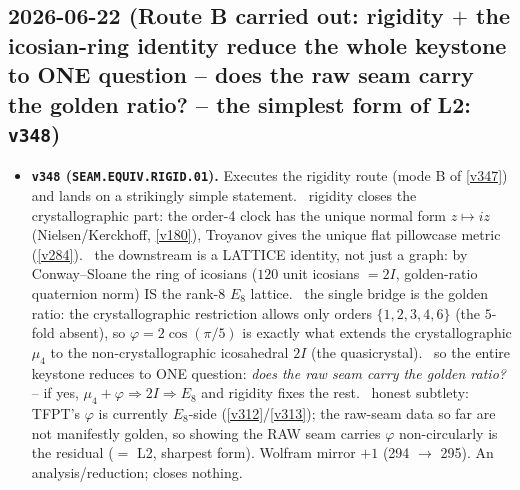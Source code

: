 \subsection*{2026-06-22 (Route B carried out: rigidity $+$ the icosian-ring identity reduce the whole keystone to ONE question -- does the raw seam carry the golden ratio? -- the simplest form of L2: \texttt{v348})}
\begin{itemize}
\item \textbf{\texttt{v348} (\texttt{SEAM.EQUIV.RIGID.01}).} Executes the rigidity route (mode B of \vref{v347}) and
lands on a strikingly simple statement. \mE\ rigidity closes the crystallographic part: the order-4 clock has the
unique normal form $z\mapsto iz$ (Nielsen/Kerckhoff, \vref{v180}), Troyanov gives the unique flat pillowcase metric
(\vref{v284}). \mE\ the downstream is a LATTICE identity, not just a graph: by Conway--Sloane the ring of icosians
($120$ unit icosians $=2I$, golden-ratio quaternion norm) IS the rank-$8$ $E_8$ lattice. \mE\ the single bridge is
the golden ratio: the crystallographic restriction allows only orders $\{1,2,3,4,6\}$ (the $5$-fold absent), so
$\varphi=2\cos(\pi/5)$ is exactly what extends the crystallographic $\mu_4$ to the non-crystallographic icosahedral
$2I$ (the quasicrystal). \mO\ so the entire keystone reduces to ONE question: \emph{does the raw seam carry the
golden ratio?} -- if yes, $\mu_4{+}\varphi\Rightarrow2I\Rightarrow E_8$ and rigidity fixes the rest. \mO\ honest
subtlety: TFPT's $\varphi$ is currently $E_8$-side (\vref{v312}/\vref{v313}); the raw-seam data so far are not
manifestly golden, so showing the RAW seam carries $\varphi$ non-circularly is the residual ($=$ L2, sharpest form).
Wolfram mirror $+1$ (294 $\to$ 295). An analysis/reduction; closes nothing.
\end{itemize}

